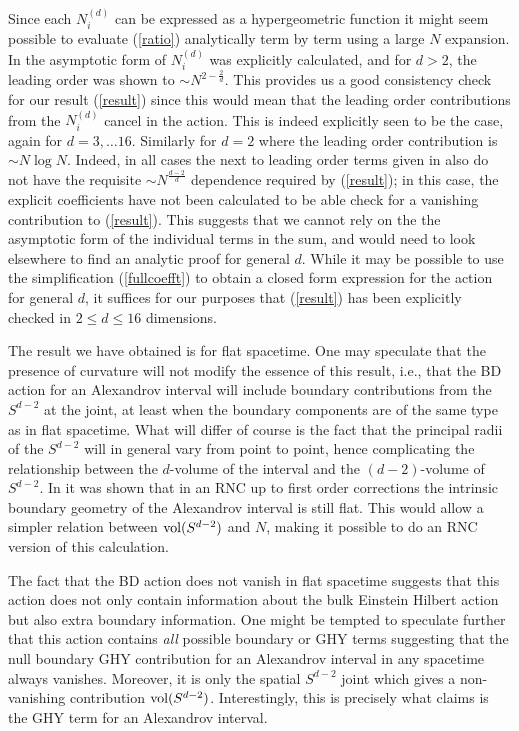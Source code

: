 \documentclass[12pt]{article}
\begin{document}
Since each $N_i^{ (d)}$  can be expressed as a hypergeometric function \cite{Glaser_Sumati:Locality_in_Causal_Set} it  might seem possible to evaluate (\ref{ratio}) analytically term by term using a large $N$ expansion.  In \cite{Glaser_Sumati:Locality_in_Causal_Set} the asymptotic form of $N_i^{ (d)}$ was explicitly calculated, and for $d>2$, the leading order was shown to  $\sim  N^{2-\frac{2}{d}}$. This provides us a good consistency check for our result (\ref{result}) since this would mean that the leading order contributions from the $N_i^{ (d)}$ cancel in the action. This is indeed explicitly seen to be the case, again for $d=3, \ldots 16$. Similarly for $d=2$ where the leading order contribution is $\sim  N \log N$.  Indeed, in all cases the next to leading order terms given in \cite{Glaser_Sumati:Locality_in_Causal_Set} also do not have the requisite $ \sim N^{\frac{d-2}{d}}$ dependence required by (\ref{result}); in this case, the explicit coefficients have not been calculated  to be able   check for  a vanishing contribution to (\ref{result}).  This suggests that  we cannot rely   on the the asymptotic form of the individual terms  in the sum, and would need to look elsewhere to find an analytic proof for general $d$. While it may be possible to use the simplification (\ref{fullcoefft})  to obtain a closed form expression for the action for general $d$, it suffices for our purposes that (\ref{result}) has been explicitly checked in $2\leq d \leq 16$ dimensions.  

The result we have obtained is for flat spacetime. One may speculate that the presence of curvature will not modify the essence of this result,  i.e., that the BD action for an Alexandrov interval  will include boundary contributions from the  $S^{d-2}$ at the joint, at least  when the boundary components  are of the same type as in flat spacetime.   What will differ of course is the fact that the principal radii of the $S^{d-2}$ will in general vary from point to point, hence complicating the relationship between the $d$-volume of the interval and the $ (d-2)$-volume of $S^{d-2}$. In  \cite{Khetrapal_Sumati:Causal_Diamond_Volume} it was shown that in an RNC up to first order corrections the intrinsic boundary geometry of the Alexandrov interval is still flat. This would allow a simpler relation between $\mathrm{vol} (S^{d-2})$ and $N$, making it possible to do an RNC version of this  calculation. 

The fact that the BD action does not vanish in flat spacetime suggests  that this action  does not only contain  information about the bulk Einstein Hilbert action but also extra boundary information.  One might be tempted to speculate further that this action contains {\it all}  possible boundary or GHY terms suggesting that the null boundary GHY contribution for an Alexandrov interval in any spacetime always vanishes. Moreover, it is only the spatial $S^{d-2}$ joint  which gives  a non-vanishing contribution $\mathrm{vol} (S^{d-2})$.  Interestingly, this is precisely what \cite{neiman} claims is the GHY term for an Alexandrov interval. 

\newpage







\end{document}
